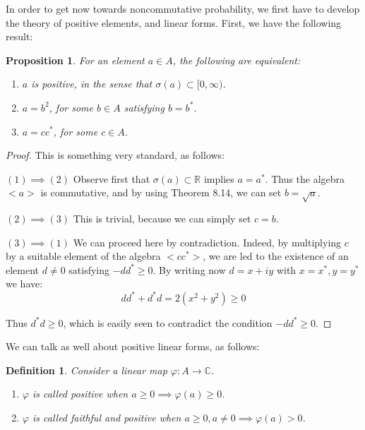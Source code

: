 \documentclass[12pt]{amsbook}
\newtheorem{definition}[theorem]{Definition}
\newtheorem{proposition}[theorem]{Proposition}
\begin{document}
In order to get now towards noncommutative probability, we first have to develop the theory of positive elements, and linear forms. First, we have the following result:


\begin{proposition}
For an element $a\in A$, the following are equivalent:
\begin{enumerate}
\item $a$ is positive, in the sense that $\sigma(a)\subset[0,\infty)$.

\item $a=b^2$, for some $b\in A$ satisfying $b=b^*$.

\item $a=cc^*$, for some $c\in A$.
\end{enumerate}
\end{proposition}

\begin{proof}
This is something very standard, as follows:

\medskip

$(1)\implies(2)$ Observe first that $\sigma(a)\subset\mathbb R$ implies $a=a^*$. Thus the algebra $<a>$ is commutative, and by using Theorem 8.14, we can set $b=\sqrt{a}$.

\medskip

$(2)\implies(3)$ This is trivial, because we can simply set $c=b$. 

\medskip

$(3)\implies(1)$ We can proceed here by contradiction. Indeed, by multiplying $c$ by a suitable element of the algebra $<cc^*>$, we are led to the existence of an element $d\neq0$ satisfying $-dd^*\geq0$. By writing now $d=x+iy$ with $x=x^*,y=y^*$ we have:
$$dd^*+d^*d
=2(x^2+y^2)
\geq0$$

Thus $d^*d\geq0$, which is easily seen to contradict the condition $-dd^*\geq0$.
\end{proof}

We can talk as well about positive linear forms, as follows:


\begin{definition}
Consider a linear map $\varphi:A\to\mathbb C$.
\begin{enumerate}
\item $\varphi$ is called positive when $a\geq0\implies\varphi(a)\geq0$.

\item $\varphi$ is called faithful and positive when $a\geq0,a\neq0\implies\varphi(a)>0$.
\end{enumerate}
\end{definition}
\end{document}
